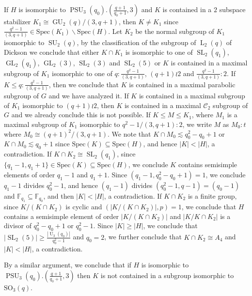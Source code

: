 \documentclass[12pt,reqno]{amsart}
\newcommand{\GL}{\operatorname{GL}}
\newcommand{\SL}{\operatorname{SL}}
\newcommand{\PSU}{\operatorname{PSU}}
\newcommand{\LL}{\operatorname{L}}
\newcommand{\UU}{\operatorname{U}}
\newcommand{\SU}{\operatorname{SU}}
\newcommand{\GU}{\operatorname{GU}}
\newcommand{\FF}{\mathbb{F}}
\theoremstyle{plain}
\theoremstyle{definition}
\begin{document}
  If $H$ is isomorphic to $\PSU_3(q_0).(\frac{q+1}{q_0+1},3)$ and $K$ is contained in a $2$ subspace stabilizer $K_1\cong \GU_2(q)/(3,q+1)$, then $K\neq K_1$ since $\frac{q^2-1}{(3,q+1)}\in \mathrm{Spec}(K_1)\backslash \mathrm{Spec}(H)$.
  Let $K_2$ be the normal subgroup of $K_1$ isomorphic to $\SU_2(q)$, by the classification of the subgroup of $\LL_2(q)$ of Dickson we conclude that either $K\cap K_1$ is isomorphic to one of $\SL_2(q_1)$, $\GL_2(q_1)$, $\GL_2(3)$, $\SL_2(3)$ and $\SL_2(5)$ or 
  $K$ is contained in a maximal subgroup of $K_1$ isomorphic to one of $q{:}\frac{q^2-1}{(3,q+1)}$, $(q+1)\wr 2$ and $\frac{q^2-1}{(3,q+1)}{:}2$.
  If $K\le q{:}\frac{q^2-1}{(3,q+1)}$, then we conclude that $K$ is contained in a maximal parabolic subgroup of $G$ and we have analyzed it. 
  If $K$ is contained in a maximal subgroup of $K_1$ isomorphic to $(q+1)\wr 2$, then $K$ is contained in a maximal $\mathcal{C}_2$ subgroup of $G$ and we already conclude this is not possible.
  If $K\le M\le K_1$, where $M_1$ is a maximal subgroup of $K_1$ isomorphic to $q^2-1/(3,q+1){:}2$, we write $M$ as $M_0{:}t$ where $M_0\cong (q+1)^2/(3,q+1)$. 
  We note that $K\cap M_0\lesssim q_0^2-q_0+1$ or $K\cap M_0\lesssim q_0+1$ since $\mathrm{Spec}(K)\subseteq \mathrm{Spec}(H)$, and hence $|K|<|H|$, a contradiction.
  If $K\cap K_2\cong \SL_2(q_1)$, since $\{q_1-1,q_1+1\}\in \mathrm{Spec}(K)\subseteq \mathrm{Spec}(H)$, we conclude $K$ contains semisimple elements of order $q_1-1$ and $q_1+1$. 
  Since $(q_1-1,q_0^2-q_0+1)=1$, we conclude $q_1-1$ divides $q_0^2-1$, and hence $(q_1-1)$ divides $(q_0^2-1,q-1)=(q_0-1)$ and $\FF_{q_1}\subseteq \FF_{q_0}$, and then $|K|<|H|$, a contradiction.
  If $K\cap K_2$ is a finite group, since $K/(K\cap K_2)$ is cyclic and $(|K/(K\cap K_2)|,p)=1$, we conclude that $H$ contains a semisimple element of order $|K/(K\cap K_2)|$ and $|K/K\cap K_2|$ is a divisor of $q_0^2-q_0+1$ or $q_0^2-1$.
  Since $|K|\ge|H|$, we conclude that $|\SL_2(5)|\ge \frac{|\UU_3(q_0)|}{q_0^2-1}$ and $q_0=2$, we further conclude that  $K\cap K_2\cong A_4$ and $|K|<|H|$, a contradiction.
  
  By a similar argument, we conclude that if $H$ is isomorphic to $\PSU_3(q_0).(\frac{q+1}{q_0+1},3)$ then $K$ is not contained in a subgroup isomorphic to $\mathrm{SO}_3(q)$.
  
\end{document}
